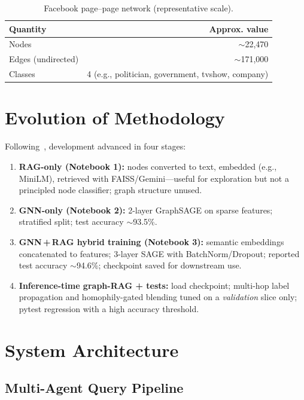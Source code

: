 \documentclass[conference]{IEEEtran}
\begin{document}
\begin{table}[t]
\centering
\caption{Facebook page--page network (representative scale).}
\label{tab:data}
\begin{tabular}{@{}l r@{}}
\toprule
Quantity & Approx. value \\
\midrule
Nodes & $\sim$22{,}470 \\
Edges (undirected) & $\sim$171{,}000 \\
Classes & 4 (e.g., politician, government, tvshow, company) \\
\bottomrule
\end{tabular}
\end{table}

\section{Evolution of Methodology}

Following~\cite{project_doc_internal}, development advanced in four stages:

\begin{enumerate}
  \item \textbf{RAG-only (Notebook 1):} nodes converted to text, embedded (e.g., MiniLM), retrieved with FAISS/Gemini---useful for exploration but not a principled node classifier; graph structure unused.
  \item \textbf{GNN-only (Notebook 2):} 2-layer GraphSAGE on sparse features; stratified split; test accuracy $\sim$93.5\%.
  \item \textbf{GNN\,+\,RAG hybrid training (Notebook 3):} semantic embeddings concatenated to features; 3-layer SAGE with BatchNorm/Dropout; reported test accuracy $\sim$94.6\%; checkpoint saved for downstream use.
  \item \textbf{Inference-time graph-RAG + tests:} load checkpoint; multi-hop label propagation and homophily-gated blending tuned on a \emph{validation} slice only; pytest regression with a high accuracy threshold.
\end{enumerate}

\section{System Architecture}

\subsection{Multi-Agent Query Pipeline}
\end{document}
